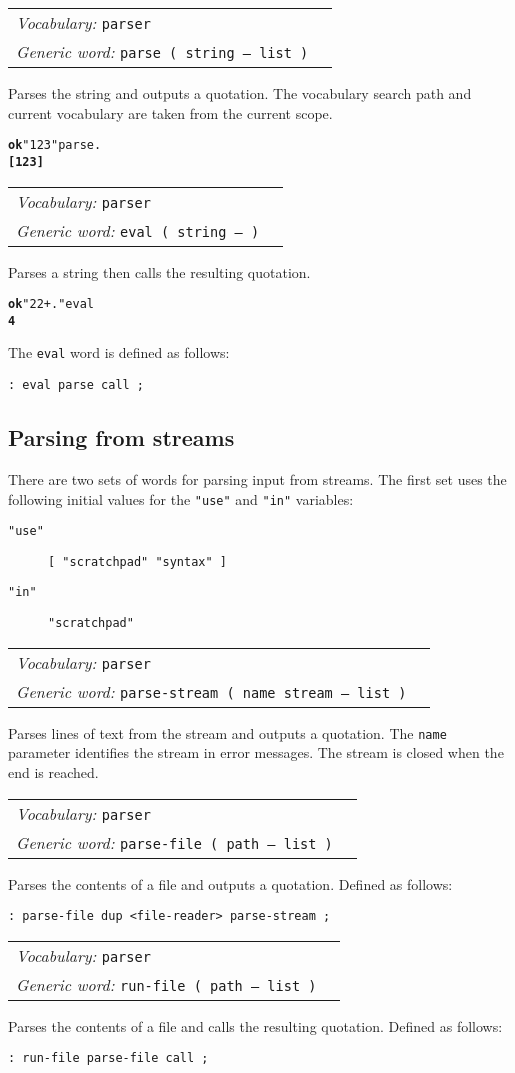 \documentclass{book}
\newcommand{\vocabulary}[1]{\emph{Vocabulary:} \texttt{#1}&\\}
\newcommand{\genericword}[2]{\index{\texttt{#1}}\emph{Generic word:} \texttt{#2}&\\}
\newcommand{\wordtable}[1]{


\begin{tabularx}{12cm}{lX}
\hline
#1
\hline
\end{tabularx}

}
\begin{document}
\wordtable{
\vocabulary{parser}
\genericword{parse}{parse~( string -- list )}
}
Parses the string and outputs a quotation. The vocabulary search path and current vocabulary are taken from the current scope.
\begin{alltt}
\textbf{ok} "1 2 3" parse .
\textbf{[ 1 2 3 ]}
\end{alltt}

\wordtable{
\vocabulary{parser}
\genericword{eval}{eval~( string -- )}
}
Parses a string then calls the resulting quotation.
\begin{alltt}
\textbf{ok} "2 2 + ." eval
\textbf{4}
\end{alltt}
The \texttt{eval} word is defined as follows:
\begin{verbatim}
: eval parse call ;
\end{verbatim}

\subsection{Parsing from streams}

There are two sets of words for parsing input from streams. The first set uses the following initial values for the \texttt{"use"} and \texttt{"in"} variables:

\begin{description}
\item[\texttt{"use"}] \texttt{[ "scratchpad" "syntax" ]}
\item[\texttt{"in"}] \texttt{"scratchpad"}
\end{description}

\wordtable{
\vocabulary{parser}
\genericword{parse-stream}{parse-stream~( name stream -- list )}
}
Parses lines of text from the stream and outputs a quotation. The \texttt{name} parameter identifies the stream in error messages. The stream is closed when the end is reached.

\wordtable{
\vocabulary{parser}
\genericword{parse-file}{parse-file~( path -- list )}
}
Parses the contents of a file and outputs a quotation. Defined as follows:
\begin{verbatim}
: parse-file dup <file-reader> parse-stream ;
\end{verbatim}
\wordtable{
\vocabulary{parser}
\genericword{run-file}{run-file~( path -- list )}
}
Parses the contents of a file and calls the resulting quotation. Defined as follows:
\begin{verbatim}
: run-file parse-file call ;
\end{verbatim}
\end{document}

